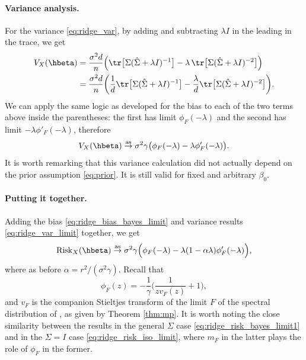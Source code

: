 \documentclass{article}
\begin{document}
\paragraph{Variance analysis.}

For the variance \eqref{eq:ridge_var}, by adding and subtracting $\lambda I$ in
the leading \smash{$\hSigma$} in the trace, we get 
\begin{align*}
V_X(\hbeta) 
&= \frac{\sigma^2 d}{n} \Big( \tr \big[ \Sigma ( \hSigma + \lambda I)^{-1} \big] -
  \lambda \, \tr \big[ \Sigma (\hSigma + \lambda I)^{-2} \big] \Big) \\
&= \frac{\sigma^2 d}{n} \bigg( \frac{1}{d} \tr \big[ \Sigma ( \hSigma + \lambda 
  I)^{-1} \big] -\frac{\lambda}{d} \tr \big[ \Sigma (\hSigma + \lambda I)^{-2} 
  \big] \bigg).
\end{align*}
We can apply the same logic as developed for the bias to each of the two terms
above inside the parentheses: the first has limit $\phi_F(-\lambda)$ and the
second has limit $-\lambda \phi'_F(-\lambda)$, therefore   
\begin{equation}
\label{eq:ridge_var_limit}
V_X(\hbeta) \asto \sigma^2 \gamma \big( \phi_F(-\lambda) - \lambda 
\phi'_F(-\lambda) \big).
\end{equation}
It is worth remarking that this variance calculation did not actually depend on
the prior assumption \eqref{eq:prior}. It is still valid for fixed and arbitrary
$\beta_0$.

\paragraph{Putting it together.}

Adding the bias \eqref{eq:ridge_bias_bayes_limit} and variance results
\eqref{eq:ridge_var_limit} together, we get
\begin{equation}
\label{eq:ridge_risk_bayes_limit1}
\Risk_X(\hbeta) \asto \sigma^2 \gamma \Big( \phi_F(-\lambda) - \lambda (1 -
\alpha \lambda) \phi'_F(-\lambda) \Big),  
\end{equation}
where as before $\alpha = r^2 / (\sigma^2 \gamma)$. Recall that 
 \[
\phi_F(z) = -\frac{1}{\gamma} \bigg( \frac{1}{z v_F(z)} + 1 \bigg),
\]
and $v_F$ is the companion Stieltjes transform of the limit $F$ of the spectral
distribution of \smash{$\hSigma$}, as given by Theorem \ref{thm:mp}. It is worth 
noting the close similarity between the results in the general $\Sigma$ case
\eqref{eq:ridge_risk_bayes_limit1} and in the $\Sigma = I$ case
\eqref{eq:ridge_risk_iso_limit}, where $m_F$ in the latter plays the role of 
$\phi_F$ in the former.
\end{document}
